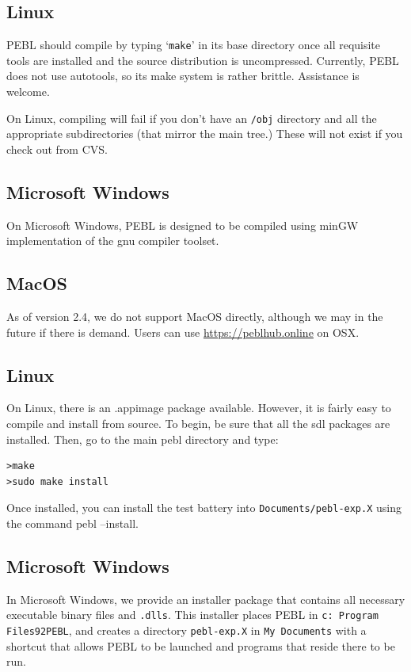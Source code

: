 \subsection{Linux}

PEBL should compile by typing `\texttt{make}' in its base directory
once all requisite tools are installed and the source distribution is
uncompressed. Currently, PEBL does not use autotools, so its make
system is rather brittle. Assistance is welcome.

On Linux, compiling will fail if you don't have an \texttt{/obj}
directory and all the appropriate subdirectories (that mirror the main
tree.)  These will not exist if you check out from CVS.

\subsection{Microsoft Windows}

On Microsoft Windows, PEBL is designed to be compiled using minGW implementation of the gnu compiler toolset.

\subsection{MacOS}
As of version 2.4, we do not support MacOS directly, although we may in the future if there is demand. Users can use \url{https://peblhub.online} on OSX.


\subsection{Linux}

On Linux, there is an .appimage package available.  However, it is fairly easy to 
compile and install from source. To begin, be sure that all the sdl packages are installed.  Then, go to the main pebl directory and type:
\begin{verbatim}
>make
>sudo make install
\end{verbatim}
Once installed, you can install the test battery into \texttt{Documents/pebl-exp.X} using the command pebl --install.

\subsection{Microsoft Windows}

In Microsoft Windows, we provide an installer package that contains
all necessary executable binary files and \texttt{.dlls}. This
installer places PEBL in \texttt{c: Program Files\char92PEBL},
and creates a directory \texttt{pebl-exp.X} in \texttt{My Documents}
with a shortcut that allows PEBL to be launched and programs that
reside there to be run.


